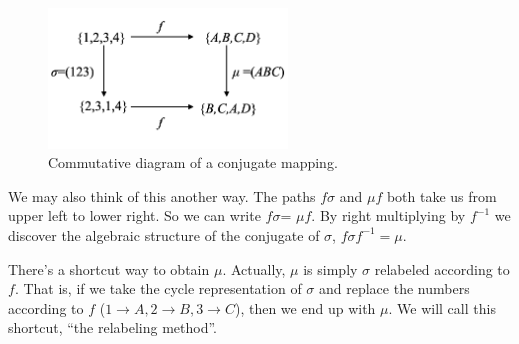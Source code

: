 \begin{figure}[ht]
\begin{center}
\includegraphics[width=2.5in]{images/Commutative1.png}
\caption{Commutative diagram of a conjugate mapping.}\label{fig:Commutative1}
\end{center}
\end{figure}

We may also think of this another way. The paths $f\sigma$ and $\mu f$  both take us from upper left to lower right. 
 So we can write $f\sigma$= $\mu f$. By right multiplying by $f^{-1}$ we discover the algebraic structure of the conjugate of $\sigma$,  $f\sigma f^{-1}=\mu$. 
 
There's a shortcut way to obtain $\mu$. Actually, $\mu$ is simply $\sigma$ relabeled according to $f$.  That is, if we take the cycle representation of $\sigma$ and replace the numbers according to $f$ ($1\rightarrow A, 2\rightarrow B, 3\rightarrow C$), then we end up with $\mu$.  We will call this shortcut, ``the relabeling method''.

